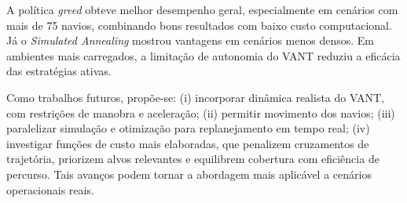 A política \textit{greed} obteve melhor desempenho geral, especialmente em cenários com mais de 75 navios, combinando bons resultados com baixo custo computacional. Já o \textit{Simulated Annealing} mostrou vantagens em cenários menos densos. Em ambientes mais carregados, a limitação de autonomia do VANT reduziu a eficácia das estratégias ativas.

Como trabalhos futuros, propõe-se: (i) incorporar dinâmica realista do VANT, com restrições de manobra e aceleração; (ii) permitir movimento dos navios; (iii) paralelizar simulação e otimização para replanejamento em tempo real; (iv) investigar funções de custo mais elaboradas, que penalizem cruzamentos de trajetória, priorizem alvos relevantes e equilibrem cobertura com eficiência de percurso. Tais avanços podem tornar a abordagem mais aplicável a cenários operacionais reais.